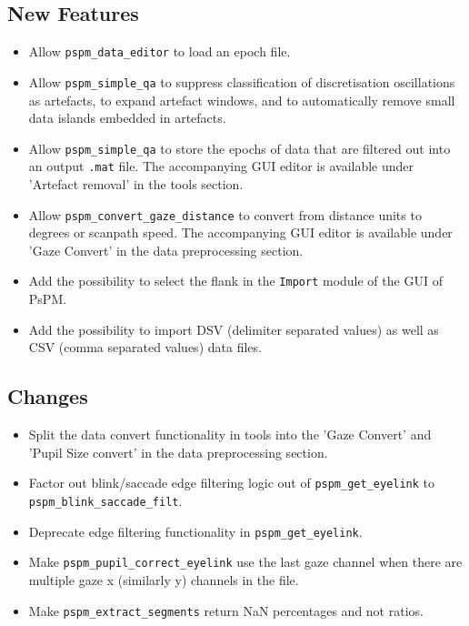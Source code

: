 \documentclass[english]{article}
\numberwithin{equation}{section}
\numberwithin{figure}{section}
\begin{document}
\subsection*{New Features}
\begin{itemize}
\item Allow \texttt{pspm\_data\_editor} to load an epoch file.
\item Allow \texttt{pspm\_simple\_qa} to suppress classification of discretisation oscillations as artefacts, to expand artefact windows, and to automatically remove small data islands embedded in artefacts.
\item Allow \texttt{pspm\_simple\_qa} to store the epochs of data that are
filtered out into an output \texttt{.mat} file. The accompanying GUI
editor is available under 'Artefact removal' in the tools section.
\item Allow \texttt{pspm\_convert\_gaze\_distance} to convert from distance
units to degrees or scanpath speed. The accompanying GUI editor is
available under 'Gaze Convert' in the data preprocessing section.
\item Add the possibility to select the flank in the \texttt{Import} module
of the GUI of PsPM.
\item Add the possibility to import DSV (delimiter separated values) as
well as CSV (comma separated values) data files.
\end{itemize}

\subsection*{Changes}
\begin{itemize}
\item Split the data convert functionality in tools into the 'Gaze Convert'
and 'Pupil Size convert' in the data preprocessing section.
\item Factor out blink/saccade edge filtering logic out of \texttt{pspm\_get\_eyelink}
to \texttt{pspm\_blink\_saccade\_filt}.
\item Deprecate edge filtering functionality in \texttt{pspm\_get\_eyelink}.
\item Make \texttt{pspm\_pupil\_correct\_eyelink} use the last gaze channel
when there are multiple gaze x (similarly y) channels in the file.
\item Make \texttt{pspm\_extract\_segments} return NaN percentages and not
ratios.
\end{itemize}
\end{document}
